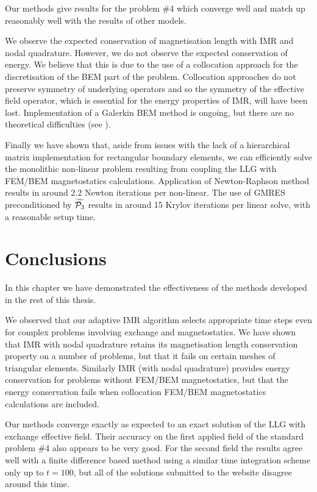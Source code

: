 Our methods give results for the \mumag problem \#4 which converge well and match up reasonably well with the results of other models.

We observe the expected conservation of magnetisation length with IMR and nodal quadrature.
However, we do not observe the expected conservation of energy.
We believe that this is due to the use of a collocation approach for the discretisation of the BEM part of the problem.
Collocation approaches do not preserve symmetry of underlying operators and so the symmetry of the effective field operator, which is essential for the energy properties of IMR, will have been lost.
Implementation of a Galerkin BEM method is ongoing, but there are no theoretical difficulties (see \eg \cite[58]{Borm2003}).

Finally we have shown that, aside from issues with the lack of a hierarchical matrix implementation for rectangular boundary elements, we can efficiently solve the monolithic non-linear problem resulting from coupling the LLG with FEM/BEM magnetostatics calculations.
Application of Newton-Raphson method results in around 2.2 Newton iterations per non-linear.
The use of GMRES preconditioned by $\widetilde{\mathcal{P}_3}$ results in around 15 Krylov iterations per linear solve, with a reasonable setup time.



\section{Conclusions}

In this chapter we have demonstrated the effectiveness of the methods developed in the rest of this thesis.

We observed that our adaptive IMR algorithm selects appropriate time steps even for complex problems involving exchange and magnetostatics.
We have shown that IMR with nodal quadrature retains its magnetisation length conservation property on a number of problems, but that it fails on certain meshes of triangular elements.
Similarly IMR (with nodal quadrature) provides energy conservation for problems without FEM/BEM magnetostatics, but that the energy conservation fails when collocation FEM/BEM magnetostatics calculations are included.

Our methods converge exactly as expected to an exact solution of the LLG with exchange effective field.
Their accuracy on the first applied field of the \mumag standard problem \#4 also appears to be very good.
For the second field the results agree well with a finite difference based method using a similar time integration scheme only up to $t=100$, but all of the solutions submitted to the \mumag website disagree around this time.


